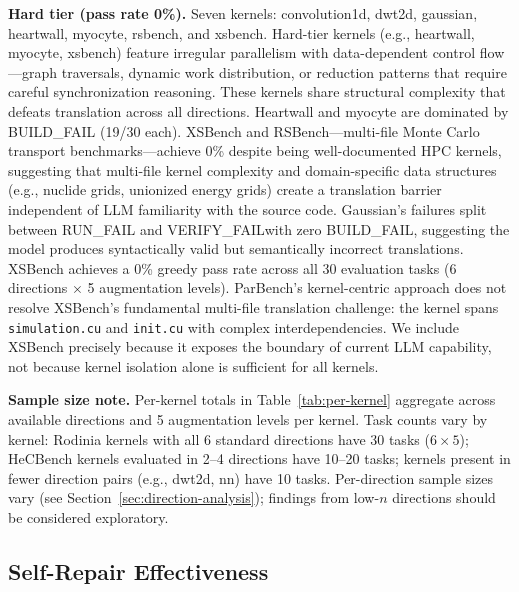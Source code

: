 \documentclass[conference]{IEEEtran}
\newcommand{\buildfail}{\textsc{BUILD\_FAIL}}
\newcommand{\runfail}{\textsc{RUN\_FAIL}}
\newcommand{\verifyfail}{\textsc{VERIFY\_FAIL}}
\begin{document}
\textbf{Hard tier (pass rate 0\%).} Seven kernels: convolution1d, dwt2d, gaussian, heartwall, myocyte, rsbench, and xsbench.
Hard-tier kernels (e.g., heartwall, myocyte, xsbench) feature irregular
parallelism with data-dependent control flow---graph traversals,
dynamic work distribution, or reduction patterns that require
careful synchronization reasoning.
These kernels share structural complexity that defeats translation across all directions. Heartwall and myocyte are dominated by \buildfail{} (19/30 each). XSBench and RSBench---multi-file Monte Carlo transport benchmarks---achieve 0\% despite being well-documented HPC kernels, suggesting that multi-file kernel complexity and domain-specific data structures (e.g., nuclide grids, unionized energy grids) create a translation barrier independent of LLM familiarity with the source code. Gaussian's failures split between \runfail{} and \verifyfail with zero \buildfail{}, suggesting the model produces syntactically valid but semantically incorrect translations.
XSBench achieves a 0\% greedy pass rate across all 30 evaluation
tasks (6 directions $\times$ 5 augmentation levels).
ParBench's kernel-centric approach does not resolve XSBench's
fundamental multi-file translation challenge: the kernel spans
\texttt{simulation.cu} and \texttt{init.cu} with complex
interdependencies. We include XSBench precisely because it exposes
the boundary of current LLM capability, not because kernel isolation alone
is sufficient for all kernels.

\textbf{Sample size note.} Per-kernel totals in Table~\ref{tab:per-kernel} aggregate across available directions and 5 augmentation levels per kernel. Task counts vary by kernel: Rodinia kernels with all 6 standard directions have 30 tasks ($6 \times 5$); HeCBench kernels evaluated in 2--4 directions have 10--20 tasks; kernels present in fewer direction pairs (e.g., dwt2d, nn) have 10 tasks. Per-direction sample sizes vary (see Section~\ref{sec:direction-analysis}); findings from low-$n$ directions should be considered exploratory.

\subsection{Self-Repair Effectiveness}
\label{sec:self-repair}
\end{document}
